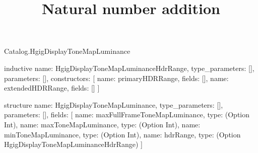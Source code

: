 \begin{lexlean}{Catalog.HgigDisplayToneMapLuminance}
\title{Natural number addition}
\begin{semanticmodule}
inductive{
  name: HgigDisplayToneMapLuminanceHdrRange,
  type_parameters: [],
  parameters: [],
  constructors: [
    {name: primaryHDRRange, fields: []},
    {name: extendedHDRRange, fields: []}
  ]
}

structure{
  name: HgigDisplayToneMapLuminance,
  type_parameters: [],
  parameters: [],
  fields: [
    {name: maxFullFrameToneMapLuminance, type: (Option Int)},
    {name: maxToneMapLuminance, type: (Option Int)},
    {name: minToneMapLuminance, type: (Option Int)},
    {name: hdrRange, type: (Option HgigDisplayToneMapLuminanceHdrRange)}
  ]
}
\end{semanticmodule}
\end{lexlean}
